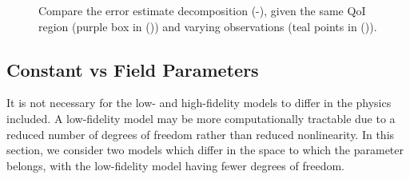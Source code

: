 \begin{figure}[htbp]
\centering
{} 
  \caption{Compare the error estimate decomposition (\protect{}-\protect{}), given the same QoI region (purple box in (\protect{})) and varying observations (teal points in (\protect{})).}
  \label{fig:dataStudy}
\end{figure}

\subsection{Constant vs Field Parameters} \label{sec:constvfield}
It is not necessary for the low- and high-fidelity models to differ in the physics included. A low-fidelity model may be more computationally tractable due to a reduced number of degrees of freedom rather than reduced nonlinearity. In this section, we consider two models which differ in the space to which the parameter belongs, with the low-fidelity model having fewer degrees of freedom.
